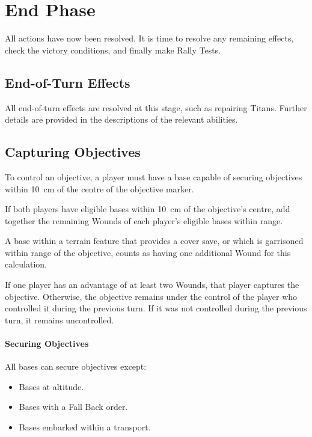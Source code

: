 \section{End Phase}

All actions have now been resolved. It is time to resolve any remaining effects, check the victory conditions, and finally make Rally Tests.

\subsection{End-of-Turn Effects}

All end-of-turn effects are resolved at this stage, such as repairing Titans. Further details are provided in the descriptions of the relevant abilities.

\subsection{Capturing Objectives}

To control an objective, a player must have a base capable of securing objectives within 10~cm of the centre of the objective marker.

If both players have eligible bases within 10~cm of the objective's centre, add together the remaining Wounds of each player's eligible bases within range.

A base within a terrain feature that provides a cover save, or which is garrisoned within range of the objective, counts as having one additional Wound for this calculation.

If one player has an advantage of at least two Wounds, that player captures the objective. Otherwise, the objective remains under the control of the player who controlled it during the previous turn. If it was not controlled during the previous turn, it remains uncontrolled.

\paragraph{Securing Objectives}

All bases can secure objectives except:

\begin{itemize}
    \item Bases at altitude.
    \item Bases with a Fall Back order.
    \item Bases embarked within a transport.
\end{itemize}

